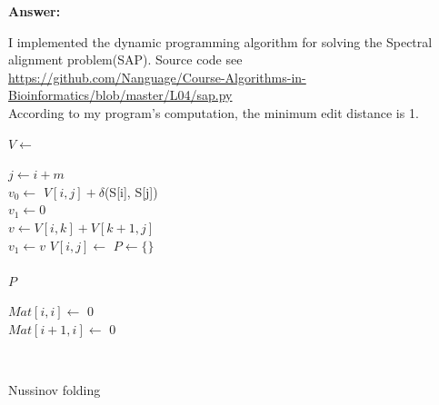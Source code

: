 \documentclass{article}
\begin{document}
\large{\textbf{Answer:}}

I implemented the dynamic programming algorithm 
for solving the Spectral alignment problem(SAP).
Source code see \\
\url{https://github.com/Nanguage/Course-Algorithms-in-Bioinformatics/blob/master/L04/sap.py} \\
According to my program's computation, the minimum edit distance is 1.


\begin{algorithm}[]



    \BlankLine

    $V \leftarrow$ \\

     {
         {
            $j \leftarrow i + m$ \\
            $v_0 \leftarrow$ $V[i,j] + \delta$(S[i], S[j]) \\
            $v_1 \leftarrow 0$ \\
             {
                $v \leftarrow V[i, k] + V[k+1, j]$ \\
                 {
                    $v_1 \leftarrow v$
                }
            }
            $V[i, j] \leftarrow$ 
        }
    }
    $P \leftarrow \{\}$ \\
     \\
    \Return $P$

    \BlankLine

     {
         {
            $Mat[i, i] \leftarrow$ 0 \\
             {
                $Mat[i+1, i] \leftarrow$ 0
            }
        }
    }

    \BlankLine

     {
         {
            \Return
        }
         {
             \\
            \Return
        }
        
    }

    \caption{Nussinov folding}
    \label{alg:Nussinov}

\end{algorithm}
\end{document}
